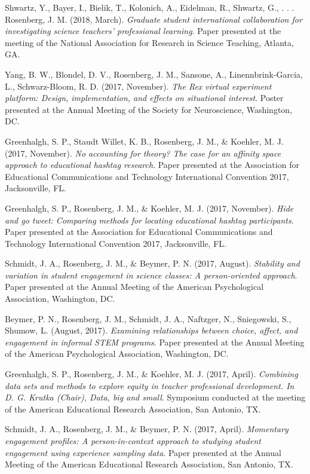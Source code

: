 \documentclass[14,]{article}
\begin{document}
Shwartz, Y., Bayer, I., Bielik, T., Kolonich, A., Eidelman, R., Shwartz,
G., . . . Rosenberg, J. M. (2018, March). \emph{Graduate student
international collaboration for investigating science teachers'
professional learning}. Paper presented at the meeting of the National
Association for Research in Science Teaching, Atlanta, GA.

Yang, B. W., Blondel, D. V., Rosenberg, J. M., Sansone, A.,
Linennbrink-Garcia, L., Schwarz-Bloom, R. D. (2017, November). \emph{The
Rex virtual experiment platform: Design, implementation, and effects on
situational interest}. Poster presented at the Annual Meeting of the
Society for Neuroscience, Washington, DC.

Greenhalgh, S. P., Staudt Willet, K. B., Rosenberg, J. M., \& Koehler,
M. J. (2017, November). \emph{No accounting for theory? The case for an
affinity space approach to educational hashtag research}. Paper
presented at the Association for Educational Communications and
Technology International Convention 2017, Jacksonville, FL.

Greenhalgh, S. P., Rosenberg, J. M., \& Koehler, M. J. (2017, November).
\emph{Hide and go tweet: Comparing methods for locating educational
hashtag participants}. Paper presented at the Association for
Educational Communications and Technology International Convention 2017,
Jacksonville, FL.

Schmidt, J. A., Rosenberg, J. M., \& Beymer, P. N. (2017, August).
\emph{Stability and variation in student engagement in science classes:
A person-oriented approach}. Paper presented at the Annual Meeting of
the American Psychological Association, Washington, DC.

Beymer, P. N., Rosenberg, J. M., Schmidt, J. A., Naftzger, N.,
Sniegowski, S., Shumow, L. (August, 2017). \emph{Examining relationships
between choice, affect, and engagement in informal STEM programs}. Paper
presented at the Annual Meeting of the American Psychological
Association, Washington, DC.

Greenhalgh, S. P., Rosenberg, J. M., \& Koehler, M. J. (2017, April).
\emph{Combining data sets and methods to explore equity in teacher
professional development. In D. G. Krutka (Chair), Data, big and small}.
Symposium conducted at the meeting of the American Educational Research
Association, San Antonio, TX.

Schmidt, J. A., Rosenberg, J. M., \& Beymer, P. N. (2017, April).
\emph{Momentary engagement profiles: A person-in-context approach to
studying student engagement using experience sampling data}. Paper
presented at the Annual Meeting of the American Educational Research
Association, San Antonio, TX.
\end{document}
